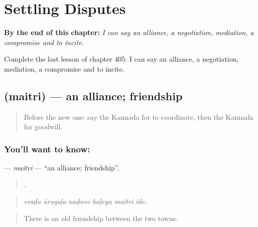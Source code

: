 
\chapter{Settling Disputes}
\label{ch:ka-settling-disputes}

\begin{chapteropening}
\textbf{By the end of this chapter:} \emph{I can say an alliance, a negotiation, mediation, a compromise and to incite.}

Complete the last lesson of chapter 405: I can say an alliance, a negotiation, mediation, a compromise and to incite.
\end{chapteropening}

\section[\texorpdfstring{\kn{ಮೈತ್ರಿ} (maitri)}{ಮೈತ್ರಿ (maitri)}]{ (maitri) — an alliance; friendship}

\label{lesson:KA-C405-maitri}



\begin{quote}
Before the new one: say the Kannada for to coordinate, then the Kannada for goodwill.
\end{quote}

\subsection*{You'll want to know: }
\textbf{} — \emph{maitri} — \textquotedblleft{}an alliance; friendship\textquotedblright{}.

\begin{quote}
     .
\end{quote}

\begin{quote}
\emph{eraḍu ūrugaḷa naḍuve haḷeya maitri ide.}
\end{quote}

\begin{quote}
There is an old friendship between the two towns.
\end{quote}

